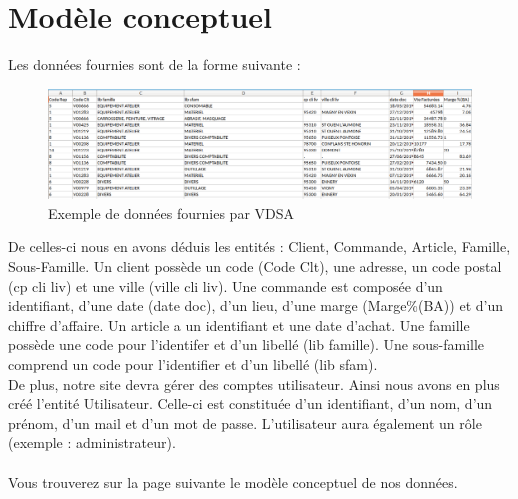 \section{Modèle conceptuel}

Les données fournies sont de la forme suivante : \\
\begin{figure}[h]
	\begin{center}
		\includegraphics[scale=0.35]{img/data.png}
		\caption{Exemple de données fournies par VDSA}
	\end{center}
\end{figure}

De celles-ci nous en avons déduis les entités : Client, Commande, Article, Famille, Sous-Famille.
Un client possède un code (Code Clt), une adresse, un code postal (cp cli liv) et une ville (ville cli liv). Une commande est composée d'un identifiant, d'une date (date doc), d'un lieu, d'une marge (Marge\%(BA)) et d'un chiffre d'affaire. Un article a un identifiant et une date d'achat. Une famille possède une code pour l'identifer et d'un libellé (lib famille). Une sous-famille comprend un code pour l'identifier et d'un libellé (lib sfam).\\
De plus, notre site devra gérer des comptes utilisateur. Ainsi nous avons en plus créé l'entité Utilisateur. Celle-ci est constituée d'un identifiant, d'un nom, d'un prénom, d'un mail et d'un mot de passe. L'utilisateur aura également un rôle (exemple : administrateur). \\ \\
\noindent
Vous trouverez sur la page suivante le modèle conceptuel de nos données.

